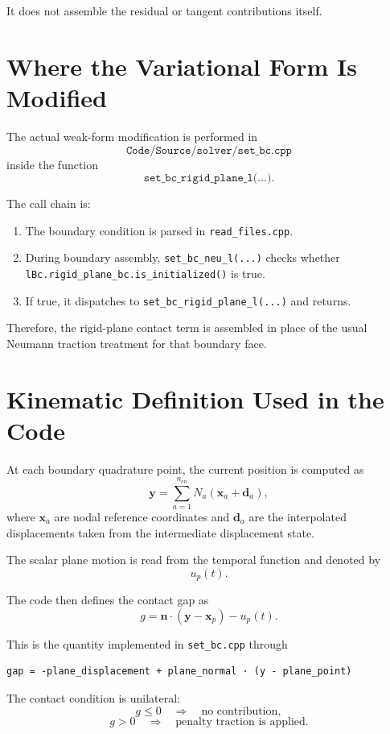 \documentclass[11pt]{article}
\begin{document}
It does not assemble the residual or tangent contributions itself.

\section{Where the Variational Form Is Modified}

The actual weak-form modification is performed in
\[
\texttt{Code/Source/solver/set\_bc.cpp}
\]
inside the function
\[
\texttt{set\_bc\_rigid\_plane\_l(...)}.
\]

The call chain is:

\begin{enumerate}[leftmargin=*]
\item The boundary condition is parsed in \texttt{read\_files.cpp}.
\item During boundary assembly, \texttt{set\_bc\_neu\_l(...)} checks whether
\texttt{lBc.rigid\_plane\_bc.is\_initialized()} is true.
\item If true, it dispatches to \texttt{set\_bc\_rigid\_plane\_l(...)} and
returns.
\end{enumerate}

Therefore, the rigid-plane contact term is assembled in place of the usual
Neumann traction treatment for that boundary face.

\section{Kinematic Definition Used in the Code}

At each boundary quadrature point, the current position is computed as
\[
\mathbf{y} = \sum_{a=1}^{n_{en}} N_a \left(\mathbf{x}_a + \mathbf{d}_a\right),
\]
where \(\mathbf{x}_a\) are nodal reference coordinates and \(\mathbf{d}_a\) are
the interpolated displacements taken from the intermediate displacement state.

The scalar plane motion is read from the temporal function and denoted by
\[
u_p(t).
\]

The code then defines the contact gap as
\[
g = \mathbf{n}\cdot(\mathbf{y}-\mathbf{x}_p) - u_p(t).
\]

This is the quantity implemented in \texttt{set\_bc.cpp} through
\begin{verbatim}
gap = -plane_displacement + plane_normal · (y - plane_point)
\end{verbatim}

The contact condition is unilateral:
\[
g \le 0 \quad \Longrightarrow \quad \text{no contribution},
\]
\[
g > 0 \quad \Longrightarrow \quad \text{penalty traction is applied}.
\]
\end{document}
